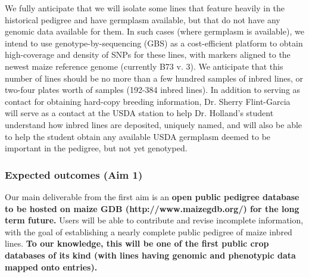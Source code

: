 \documentclass[final,12pt]{article}
\begin{document}
We fully anticipate that we will isolate some lines that feature heavily in the historical pedigree and have germplasm available, but that do not have any genomic data available for them. 
In such cases (where germplasm is available), we intend to use genotype-by-sequencing (GBS) \citep{Elshire:2011ha} as a cost-efficient platform \citep{Glaubitz:2014eu} to obtain high-coverage and density of SNPs  for these lines, with markers aligned to the newest maize reference genome (currently B73 v. 3). We anticipate that this number of lines should be no more than a few hundred samples of inbred lines, or two-four plates worth of samples (192-384 inbred lines).
In addition to serving as contact for obtaining hard-copy breeding information, Dr. Sherry Flint-Garcia will serve as a contact at the USDA station to help Dr. Holland's student understand how inbred lines are deposited, uniquely named, and will also be able to help the student obtain any available USDA germplasm deemed to be important in the pedigree, but not yet genotyped.

\subsubsection*{Expected outcomes (Aim 1)}
Our main deliverable from the first aim is an \textbf{open public pedigree database to be hosted on maize GDB (http://www.maizegdb.org/) for the long term future.} Users will be able to contribute and revise incomplete information, with the goal of establishing a nearly complete public pedigree of maize inbred lines. \textbf{To our knowledge, this will be one of the first public crop databases of its kind (with lines having genomic and phenotypic data mapped onto entries).}  
\end{document}

